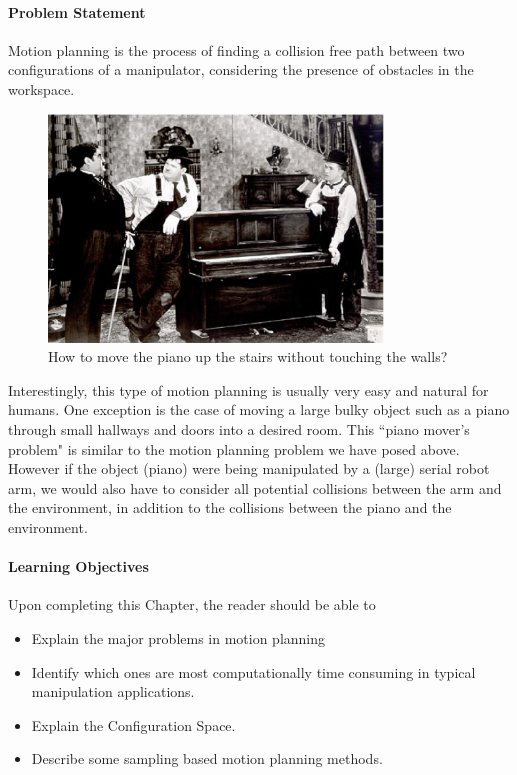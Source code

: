 \paragraph{Problem Statement}

Motion planning is the process of finding a collision free path between two configurations of a manipulator, considering the presence of obstacles in the workspace.  

\begin{figure}\centering
\includegraphics[width=3.5in]{figs08/LaurelHardyPiano.eps}
\caption{How to move the piano up the stairs without touching the walls?}\label{laurelhardy}
\end{figure}

Interestingly, this type of motion planning is usually very easy and natural for humans.  One exception is the case of moving a large bulky object such as a piano through small hallways and doors into a desired room.   This ``piano mover's problem" is similar to the motion planning problem we have posed above.  However if the object (piano) were being manipulated by a (large) serial robot arm, we would also have to consider all potential collisions between the arm and the environment, in addition to the collisions between the piano and the environment. 

\paragraph{Learning Objectives}
Upon completing this Chapter, the reader should be able to
\begin{itemize}
  \item Explain the major problems in motion planning
  \item Identify which ones are most computationally time consuming in typical manipulation applications. 
  \item Explain the Configuration Space.
  \item Describe some sampling based motion planning methods. 
\end{itemize}